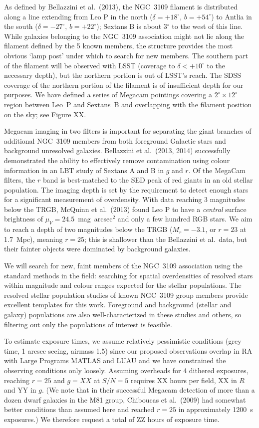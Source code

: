 As defined by Bellazzini et al.\ (2013), the NGC~3109 filament is  distributed along a line extending from Leo P in the 
north ($\delta = +18^{\circ}$, $b = +54^{\circ}$) to
Antlia in the south ($\delta = -27^{\circ}$, $b = +22^{\circ}$); Sextans B is about 3$^{\circ}$ to the west of this line.
While galaxies belonging to the NGC~3109 association might not lie along the filament defined by
the 5 known members, the structure provides the most obvious `lamp post' under which to search for new
members. The southern part of the filament will be observed with LSST (coverage to $\delta < +10^{\circ}$ to the necessary depth),
but the northern portion is out of LSST's reach. The SDSS coverage of the northern portion of the filament
is of insufficient depth for our purposes.
We have defined a series of Megacam pointings covering a $2^{\circ}\times12^{\circ}$ region between 
Leo~P and Sextans~B and overlapping with the filament position on the sky; see Figure XX.

Megacam imaging in two filters is important for separating the giant branches of additional NGC~3109
members from both foreground Galactic stars and background unresolved galaxies.  Bellazzini et al.\ (2013, 2014)
successfully demonstrated the ability to effectively remove contamination using colour information
in an LBT study of Sextans A and B in $g$ and $r$. Of the MegaCam filters, the $r$ band is best-matched to the SED 
peak of red giants in an old stellar population.
The imaging depth is set by the requirement to detect enough stars for a significant measurement of overdensity. 
With data reaching 3 magnitudes below the TRGB, McQuinn et al.\ (2013) found Leo P to have a {\em central} surface brightness 
of $\mu_V=24.5$~mag~arcsec$^2$ and only a few hundred RGB stars. We aim to reach 
a depth of two magnitudes below the TRGB ($M_r = -3.1$, or  $r=23$ at 1.7~Mpc), meaning $r=25$;
this is shallower than the Bellazzini et al.\  data, but their fainter objects were dominated by background galaxies. 

We will search for new, faint members of the NGC~3109 association using the standard methods in the field:
searching for spatial overdensities of resolved stars within magnitude and colour ranges expected for the stellar populations.
The resolved stellar population studies of known NGC~3109 group members provide excellent templates for
this work. Foreground and background (stellar and galaxy) populations are also well-characterized in these
studies and others, so filtering out only the populations of interest is feasible.

To estimate exposure times, we assume relatively  pessimistic conditions (grey time, 1 arcsec seeing, airmass 1.5)
since our proposed observations  overlap in RA with Large Programs MATLAS and LUAU and we have constrained the observing
conditions only loosely. Assuming overheads for 4 dithered exposures, reaching 
$r=25$ and $g=XX$ at $S/N=5$ requires XX hours per field, XX in $R$ and YY in $g$.
(We note that in their successful Megacam detection of more than a 
dozen dwarf galaxies in the M81 group, Chiboucas et al.\ (2009) had somewhat
better conditions than assumed here and reached $r=25$ in approximately 1200~s exposures.)
We therefore request a total of ZZ hours of exposure time.


